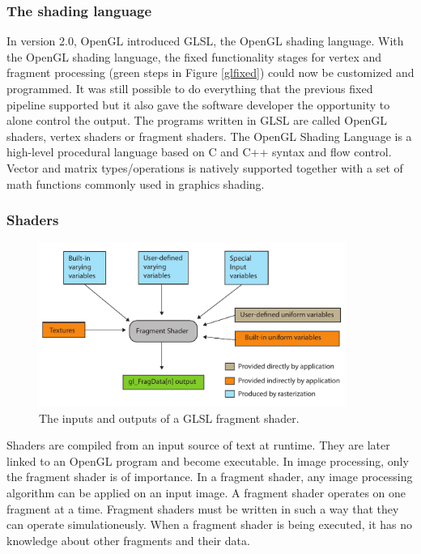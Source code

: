 \subsubsection{The shading language}

In version 2.0, OpenGL introduced GLSL, the OpenGL shading language. With the OpenGL shading language, the fixed functionality stages for vertex and fragment processing (green steps in Figure \ref{glfixed}) could now be customized and programmed\cite{glshadinglanguage}. It was still possible to do everything that the previous fixed pipeline supported but it also gave the software developer the opportunity to alone control the output. The programs written in GLSL are called OpenGL shaders, vertex shaders or fragment shaders. The OpenGL Shading Language is a high-level procedural language based on C and C++ syntax and flow control. Vector and matrix types/operations is natively supported together with a set of  math functions commonly used in graphics shading.
\newline

\subsubsection{Shaders}

\begin{figure}[ht!]
\centering
\includegraphics[width=100mm]{img/frag.pdf}
\caption{The inputs and outputs of a GLSL fragment shader.}
\label{glfrag}
\end{figure}

Shaders are compiled from an input source of text at runtime. They are later linked to an OpenGL program and become executable. In image processing, only the fragment shader is of importance. In a fragment shader, any image processing algorithm can be applied on an input image. A fragment shader operates on one fragment at a time. Fragment shaders must be written in such a way that they can operate simulationeusly. When a fragment shader is being executed, it has no knowledge about other fragments and their data. 
\newline

